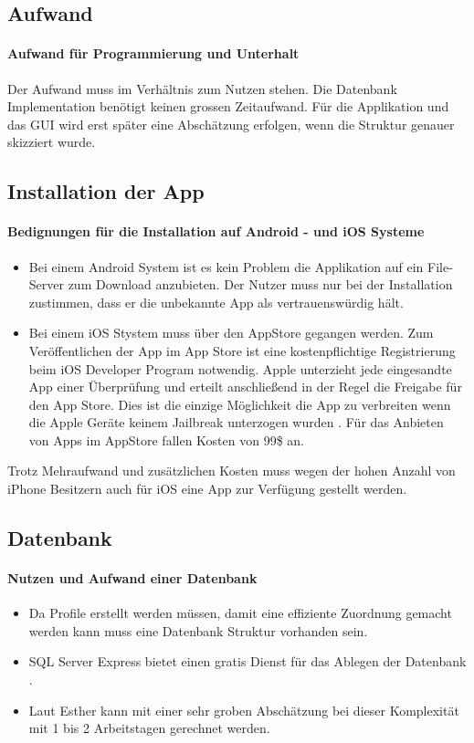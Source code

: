 \subsection{Aufwand}
\paragraph{Aufwand für Programmierung und Unterhalt} Der Aufwand muss im Verhältnis zum Nutzen stehen. Die Datenbank Implementation benötigt keinen grossen Zeitaufwand. Für die Applikation und das GUI wird erst später eine Abschätzung erfolgen, wenn die Struktur genauer skizziert wurde.

\subsection{Installation der App}
\paragraph{Bedignungen für die Installation auf Android - und iOS Systeme}
\begin{itemize}
\item Bei einem Android System ist es kein Problem die Applikation auf ein File-Server zum Download anzubieten. Der Nutzer muss nur bei der Installation zustimmen, dass er die unbekannte App als vertrauenswürdig hält.
\item Bei einem iOS Stystem muss über den AppStore gegangen werden.  Zum Veröffentlichen der App im App Store ist eine kostenpflichtige Registrierung beim iOS Developer Program notwendig. Apple unterzieht jede eingesandte App einer Überprüfung und erteilt anschließend in der Regel die Freigabe für den App Store. Dies ist die einzige Möglichkeit die App zu verbreiten wenn die Apple Geräte keinem Jailbreak unterzogen wurden \cite{appStore}. Für das Anbieten von Apps im AppStore fallen Kosten von 99\$ an.
\end{itemize}
Trotz Mehraufwand und zusätzlichen Kosten muss wegen der hohen Anzahl von iPhone Besitzern auch für iOS eine App zur Verfügung gestellt werden.

\subsection{Datenbank}
\paragraph{Nutzen und Aufwand einer Datenbank}\begin{itemize}
\item Da Profile erstellt werden müssen, damit eine effiziente Zuordnung gemacht werden kann muss eine Datenbank Struktur vorhanden sein.
\item SQL Server Express bietet einen gratis Dienst für das Ablegen der Datenbank \cite{SQL}.
\item Laut Esther kann mit einer sehr groben Abschätzung bei dieser Komplexität mit 1 bis 2 Arbeitstagen gerechnet werden.
\end{itemize}

